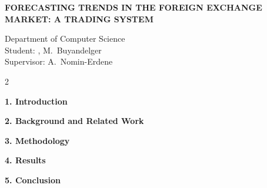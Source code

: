 \renewcommand{\figurename}{Figure}
\renewcommand{\tablename}{Table}
\thispagestyle{plain}
\captionsetup{list=no}

\vspace*{-6mm}
\begin{center}
\textbf{\large FORECASTING TRENDS IN THE FOREIGN EXCHANGE MARKET: A TRADING SYSTEM}\\[1mm]
\end{center}

\begin{flushright}
Department of Computer Science\\
Student: \studentID, M.~Buyandelger\\
Supervisor: A.~Nomin-Erdene
\end{flushright}

\vspace{1mm}
\setlength{\columnsep}{7mm}
\begin{multicols*}{2}
\sloppy

\noindent\textbf{1. Introduction}


\noindent\textbf{2. Background and Related Work}


\noindent\textbf{3. Methodology}


\noindent\textbf{4. Results}


\noindent\textbf{5. Conclusion}

\end{multicols*}

